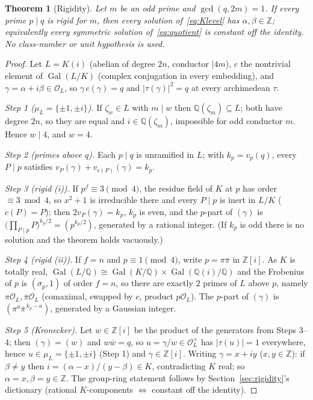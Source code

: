 \documentclass[11pt]{article}
\theoremstyle{plain}
\newtheorem{theorem}{Theorem}[section]
\theoremstyle{definition}
\theoremstyle{remark}
\newcommand{\Z}{\mathbb Z}
\newcommand{\Q}{\mathbb Q}
\newcommand{\OL}{\mathcal O_L}
\newcommand{\Gal}{\operatorname{Gal}}
\begin{document}
\begin{theorem}[Rigidity]\label{thm:rigidity}
Let $m$ be an odd prime and $\gcd(q,2m)=1$. If every prime $p\mid q$ is rigid
for $m$, then every solution of~\eqref{eq:Klevel} has $\alpha,\beta\in\Z$;
equivalently every symmetric solution of~\eqref{eq:quotient} is constant off the
identity. No class-number or unit hypothesis is used.
\end{theorem}

\begin{proof}
Let $L=K(i)$ (abelian of degree $2n$, conductor $\mid4m$), $c$ the nontrivial
element of $\Gal(L/K)$ (complex conjugation in every embedding), and
$\gamma=\alpha+i\beta\in\OL$, so $\gamma\,c(\gamma)=q$ and $|\tau(\gamma)|^2=q$
at every archimedean $\tau$.

\emph{Step 1 ($\mu_L=\{\pm1,\pm i\}$).} If $\zeta_w\in L$ with $m\mid w$ then
$\Q(\zeta_m)\subseteq L$; both have degree $2n$, so they are equal and
$i\in\Q(\zeta_m)$, impossible for odd conductor $m$. Hence $w\mid4$, and $w=4$.

\emph{Step 2 (primes above $q$).} Each $p\mid q$ is unramified in $L$; with
$k_p=v_p(q)$, every $P\mid p$ satisfies
$v_P(\gamma)+v_{c(P)}(\gamma)=k_p$.

\emph{Step 3 (rigid (i)).} If $p^f\equiv3\pmod4$, the residue field of $K$ at
$p$ has order $\equiv3\bmod4$, so $x^2+1$ is irreducible there and every $P\mid
p$ is inert in $L/K$ ($c(P)=P$); then $2v_P(\gamma)=k_p$, $k_p$ is even, and the
$p$-part of $(\gamma)$ is $\bigl(\prod_{P\mid p}P\bigr)^{k_p/2}=(p^{k_p/2})$,
generated by a rational integer. (If $k_p$ is odd there is no solution and the
theorem holds vacuously.)

\emph{Step 4 (rigid (ii)).} If $f=n$ and $p\equiv1\pmod4$, write
$p=\pi\overline\pi$ in $\Z[i]$. As $K$ is totally real,
$\Gal(L/\Q)\cong\Gal(K/\Q)\times\Gal(\Q(i)/\Q)$ and the Frobenius of $p$ is
$(\sigma_p,1)$ of order $f=n$, so there are exactly $2$ primes of $L$ above $p$,
namely $\pi\OL,\overline\pi\OL$ (comaximal, swapped by $c$, product $p\OL$).
The $p$-part of $(\gamma)$ is $(\pi^a\overline\pi^{\,k_p-a})$, generated by a
Gaussian integer.

\emph{Step 5 (Kronecker).} Let $w\in\Z[i]$ be the product of the generators from
Steps 3--4; then $(\gamma)=(w)$ and $w\overline w=q$, so $u=\gamma/w\in\OL^\times$
has $|\tau(u)|=1$ everywhere, hence $u\in\mu_L=\{\pm1,\pm i\}$ (Step 1) and
$\gamma\in\Z[i]$. Writing $\gamma=x+iy$ ($x,y\in\Z$): if $\beta\ne y$ then
$i=(\alpha-x)/(y-\beta)\in K$, contradicting $K$ real; so $\alpha=x,\beta=y\in\Z$.
The group-ring statement follows by Section~\ref{sec:rigidity}'s dictionary
(rational $K$-components $\Leftrightarrow$ constant off the identity).
\end{proof}
\end{document}
